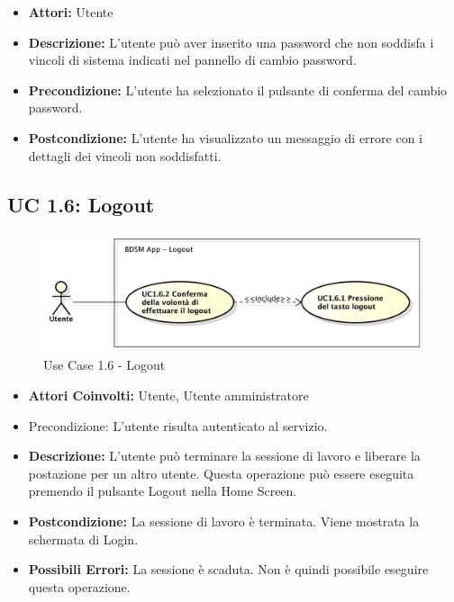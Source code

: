 \begin{itemize}
    \item \textbf{Attori:} Utente
    \item \textbf{Descrizione:} L'utente può aver inserito una password che non soddisfa i vincoli di sistema indicati nel pannello di cambio password.
    \item \textbf{Precondizione:} L'utente ha selezionato il pulsante di conferma del cambio password.
    \item \textbf{Postcondizione:} L'utente ha visualizzato un messaggio di errore con i dettagli dei vincoli non soddisfatti.
\end{itemize}

\clearpage


\subsection{UC 1.6: Logout}

\begin{figure}[htbp]
    \centering
    \centerline{\includegraphics[scale=0.5]{./images/UC1_6.pdf}}
    \caption{Use Case 1.6 - Logout}
\end{figure}

\begin{itemize}
    \item \textbf{Attori Coinvolti:} Utente, Utente amministratore
    \item {Precondizione:} L'utente risulta autenticato al servizio.
    \item \textbf{Descrizione:} L'utente può terminare la sessione di lavoro e liberare la postazione per un altro utente. Questa operazione può essere eseguita premendo il pulsante Logout nella Home Screen.
    \item \textbf{Postcondizione:} La sessione di lavoro è terminata. Viene mostrata la schermata di Login.
    \item \textbf{Possibili Errori:} La sessione è scaduta. Non è quindi possibile eseguire questa operazione.
\end{itemize}

